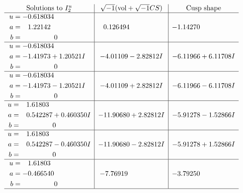 \documentclass[1p]{elsarticle_modified}
\theoremstyle{definition}
\newcommand{\I}{\sqrt{-1}}
\begin{document}
$$\begin{array}{c|c|c}  
\text{Solutions to }I^u_{2}& \I (\text{vol} + \sqrt{-1}CS) & \text{Cusp shape}\\
 \hline 
\begin{aligned}
u &= -0.618034\phantom{ +0.000000I} \\
a &= \phantom{-}1.22142\phantom{ +0.000000I} \\
b &= \phantom{-0.000000 } 0\end{aligned}
 & \phantom{-}0.126494\phantom{ +0.000000I} & -1.14270\phantom{ +0.000000I} \\ \hline\begin{aligned}
u &= -0.618034\phantom{ +0.000000I} \\
a &= -1.41973 + 1.20521 I \\
b &= \phantom{-0.000000 } 0\end{aligned}
 & -4.01109 - 2.82812 I & -6.11966 + 6.11708 I \\ \hline\begin{aligned}
u &= -0.618034\phantom{ +0.000000I} \\
a &= -1.41973 - 1.20521 I \\
b &= \phantom{-0.000000 } 0\end{aligned}
 & -4.01109 + 2.82812 I & -6.11966 - 6.11708 I \\ \hline\begin{aligned}
u &= \phantom{-}1.61803\phantom{ +0.000000I} \\
a &= \phantom{-}0.542287 + 0.460350 I \\
b &= \phantom{-0.000000 } 0\end{aligned}
 & -11.90680 + 2.82812 I & -5.91278 - 1.52866 I \\ \hline\begin{aligned}
u &= \phantom{-}1.61803\phantom{ +0.000000I} \\
a &= \phantom{-}0.542287 - 0.460350 I \\
b &= \phantom{-0.000000 } 0\end{aligned}
 & -11.90680 - 2.82812 I & -5.91278 + 1.52866 I \\ \hline\begin{aligned}
u &= \phantom{-}1.61803\phantom{ +0.000000I} \\
a &= -0.466540\phantom{ +0.000000I} \\
b &= \phantom{-0.000000 } 0\end{aligned}
 & -7.76919\phantom{ +0.000000I} & -3.79250\phantom{ +0.000000I}\\
 \hline 
 \end{array}$$\newpage
\end{document}
